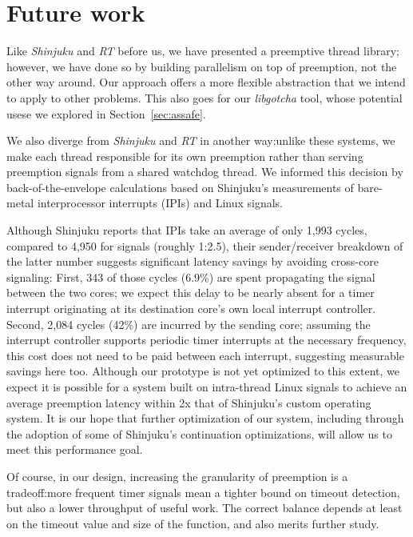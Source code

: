 \section{Future work}



Like \textit{Shinjuku} and \textit{RT} before us, we have presented a preemptive
thread library; however, we have done so by building parallelism on top of
preemption,
not the other way around.  Our approach offers a more flexible abstraction that
we intend to apply to other problems.  This also goes for our \textit{libgotcha}
tool, whose potential usese we explored in Section~\ref{sec:assafe}.


We also diverge from \textit{Shinjuku} and \textit{RT}
in another way:\@ unlike these systems, we make each thread responsible for
its own preemption rather than serving preemption signals from a shared watchdog
thread.  We informed this decision by back-of-the-envelope calculations based on
Shinjuku's measurements of bare-metal interprocessor
interrupts (IPIs) and Linux signals.

Although Shinjuku reports that IPIs take an average of only 1,993 cycles, compared to
4,950 for signals (roughly 1:2.5), their sender/receiver breakdown of the latter
number suggests significant latency savings by avoiding cross-core signaling:
First, 343 of those cycles (6.9\%) are spent propagating the signal between the two
cores; we expect this delay to be nearly absent for a timer interrupt originating at
its destination core's own local interrupt controller.  Second, 2,084 cycles (42\%)
are incurred by the sending core; assuming the interrupt controller supports
periodic timer interrupts at the necessary frequency, this cost does not need to be
paid between each interrupt, suggesting measurable savings here too.  Although
our prototype is not yet optimized to this extent, we expect it is possible for a
system built on intra-thread Linux signals to achieve an average preemption latency
within 2x that of Shinjuku's custom operating system.  It is our hope that further
optimization of our system, including through the adoption of some of Shinjuku's
continuation optimizations, will allow us to meet this performance goal.

Of course, in our design, increasing the granularity of preemption is a tradeoff:\@ more
frequent timer signals mean a tighter bound on timeout detection, but also a lower
throughput of useful work.  The correct balance depends at least on the
timeout value and size of the function, and also merits further study.


